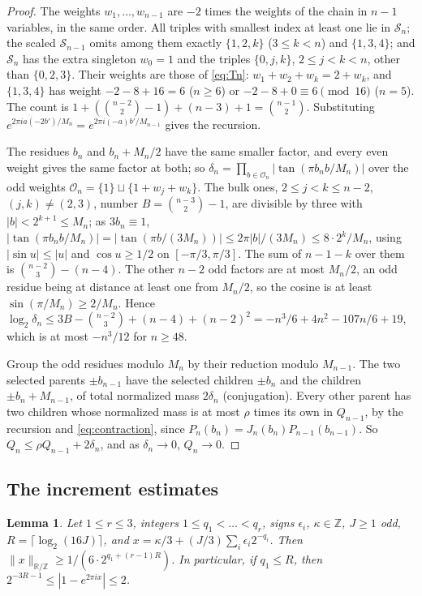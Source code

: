 \documentclass[11pt,a4paper]{article}
\newtheorem{lemma}[theorem]{Lemma}
\theoremstyle{definition}
\newcommand{\Z}{\mathbb{Z}}
\begin{document}
\begin{proof}
The weights $w_1,\dots,w_{n-1}$ are $-2$ times the weights of the chain in
$n-1$ variables, in the same order. All triples with smallest index at least one
lie in $\mathcal S_n$; the scaled $\mathcal S_{n-1}$ omits among them exactly
$\{1,2,k\}$ ($3\le k<n$) and $\{1,3,4\}$; and $\mathcal S_n$ has the extra
singleton $w_0=1$ and the triples $\{0,j,k\}$, $2\le j<k<n$, other than
$\{0,2,3\}$. Their weights are those of \eqref{eq:Tn}: $w_1+w_2+w_k=2+w_k$, and
$\{1,3,4\}$ has weight $-2-8+16=6$ ($n\ge6$) or $-2-8+0\equiv6\pmod{16}$ ($n=5$).
The count is $1+(\binom{n-2}2-1)+(n-3)+1=\binom{n-1}2$. Substituting
$e^{2\pi i a(-2b')/M_n}=e^{2\pi i(-a)b'/M_{n-1}}$ gives the recursion.

The residues $b_n$ and $b_n+M_n/2$ have the same smaller factor, and every even
weight gives the same factor at both; so $\delta_n=\prod_{b\in\mathcal O_n}
|\tan(\pi b_nb/M_n)|$ over the odd weights $\mathcal O_n=\{1\}\sqcup\{1+w_j+w_k\}$.
The bulk ones, $2\le j<k\le n-2$, $(j,k)\ne(2,3)$, number
$B=\binom{n-3}2-1$, are divisible by three with $|b|<2^{k+1}\le M_n$; as
$3b_n\equiv1$, $|\tan(\pi b_nb/M_n)|=|\tan(\pi b/(3M_n))|\le2\pi|b|/(3M_n)\le
8\cdot2^k/M_n$, using $|\sin u|\le|u|$ and $\cos u\ge1/2$ on $[-\pi/3,\pi/3]$.
The sum of $n-1-k$ over them is $\binom{n-2}3-(n-4)$. The other $n-2$ odd
factors are at most $M_n/2$, an odd residue being at distance at least one from
$M_n/2$, so the cosine is at least $\sin(\pi/M_n)\ge2/M_n$. Hence
$\log_2\delta_n\le3B-\binom{n-2}3+(n-4)+(n-2)^2=-n^3/6+4n^2-107n/6+19$, which
is at most $-n^3/12$ for $n\ge48$.

Group the odd residues modulo $M_n$ by their reduction modulo $M_{n-1}$. The
two selected parents $\pm b_{n-1}$ have the selected children $\pm b_n$ and the
children $\pm b_n+M_{n-1}$, of total normalized mass $2\delta_n$ (conjugation).
Every other parent has two children whose normalized mass is at most $\rho$
times its own in $Q_{n-1}$, by the recursion and \eqref{eq:contraction}, since
$P_n(b_n)=J_n(b_n)P_{n-1}(b_{n-1})$. So $Q_n\le\rho Q_{n-1}+2\delta_n$, and as
$\delta_n\to0$, $Q_n\to0$.
\end{proof}

\subsection{The increment estimates}

\begin{lemma}\label{lem:sparse}
Let $1\le r\le3$, integers $1\le q_1<\dots<q_r$, signs $\epsilon_i$,
$\kappa\in\Z$, $J\ge1$ odd, $R=\lceil\log_2(16J)\rceil$, and
$x=\kappa/3+(J/3)\sum_i\epsilon_i2^{-q_i}$. Then $\|x\|_{\mathbb R/\Z}\ge
1/(6\cdot2^{q_1+(r-1)R})$. In particular, if $q_1\le R$, then
$2^{-3R-1}\le|1-e^{2\pi ix}|\le2$.
\end{lemma}
\end{document}
